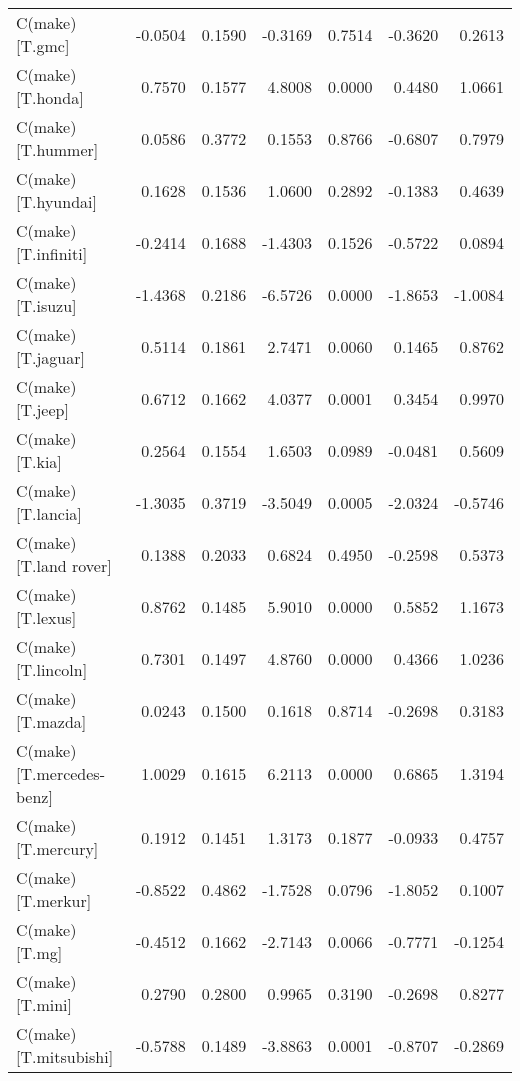 \begin{table}
\begin{center}
\begin{tabular}{lrrrrrr}
C(make)[T.gmc]           & -0.0504 &   0.1590 &  -0.3169 &      0.7514 & -0.3620 &  0.2613  \\
C(make)[T.honda]         &  0.7570 &   0.1577 &   4.8008 &      0.0000 &  0.4480 &  1.0661  \\
C(make)[T.hummer]        &  0.0586 &   0.3772 &   0.1553 &      0.8766 & -0.6807 &  0.7979  \\
C(make)[T.hyundai]       &  0.1628 &   0.1536 &   1.0600 &      0.2892 & -0.1383 &  0.4639  \\
C(make)[T.infiniti]      & -0.2414 &   0.1688 &  -1.4303 &      0.1526 & -0.5722 &  0.0894  \\
C(make)[T.isuzu]         & -1.4368 &   0.2186 &  -6.5726 &      0.0000 & -1.8653 & -1.0084  \\
C(make)[T.jaguar]        &  0.5114 &   0.1861 &   2.7471 &      0.0060 &  0.1465 &  0.8762  \\
C(make)[T.jeep]          &  0.6712 &   0.1662 &   4.0377 &      0.0001 &  0.3454 &  0.9970  \\
C(make)[T.kia]           &  0.2564 &   0.1554 &   1.6503 &      0.0989 & -0.0481 &  0.5609  \\
C(make)[T.lancia]        & -1.3035 &   0.3719 &  -3.5049 &      0.0005 & -2.0324 & -0.5746  \\
C(make)[T.land rover]    &  0.1388 &   0.2033 &   0.6824 &      0.4950 & -0.2598 &  0.5373  \\
C(make)[T.lexus]         &  0.8762 &   0.1485 &   5.9010 &      0.0000 &  0.5852 &  1.1673  \\
C(make)[T.lincoln]       &  0.7301 &   0.1497 &   4.8760 &      0.0000 &  0.4366 &  1.0236  \\
C(make)[T.mazda]         &  0.0243 &   0.1500 &   0.1618 &      0.8714 & -0.2698 &  0.3183  \\
C(make)[T.mercedes-benz] &  1.0029 &   0.1615 &   6.2113 &      0.0000 &  0.6865 &  1.3194  \\
C(make)[T.mercury]       &  0.1912 &   0.1451 &   1.3173 &      0.1877 & -0.0933 &  0.4757  \\
C(make)[T.merkur]        & -0.8522 &   0.4862 &  -1.7528 &      0.0796 & -1.8052 &  0.1007  \\
C(make)[T.mg]            & -0.4512 &   0.1662 &  -2.7143 &      0.0066 & -0.7771 & -0.1254  \\
C(make)[T.mini]          &  0.2790 &   0.2800 &   0.9965 &      0.3190 & -0.2698 &  0.8277  \\
C(make)[T.mitsubishi]    & -0.5788 &   0.1489 &  -3.8863 &      0.0001 & -0.8707 & -0.2869  \\

\end{tabular}
\end{center}
\end{table}
